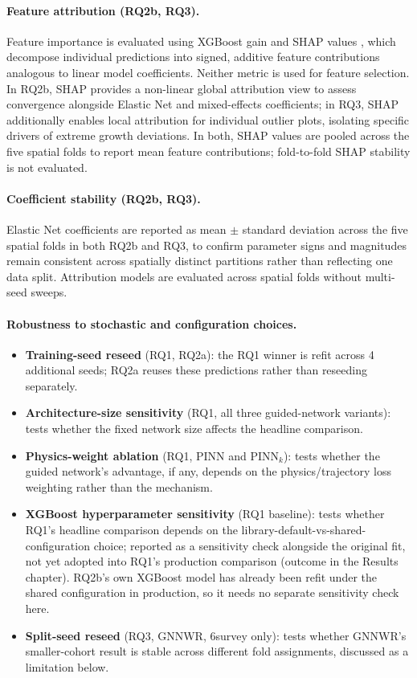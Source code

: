 \documentclass[11pt,a4paper]{report}
\begin{document}
\paragraph*{Feature attribution (RQ2b, RQ3).}
Feature importance is evaluated using XGBoost gain and SHAP values \citep{lundberg2017unified}, which decompose individual predictions into signed, additive feature contributions analogous to linear model coefficients. Neither metric is used for feature selection. In RQ2b, SHAP provides a non-linear global attribution view to assess convergence alongside Elastic Net and mixed-effects coefficients; in RQ3, SHAP additionally enables local attribution for individual outlier plots, isolating specific drivers of extreme growth deviations. In both, SHAP values are pooled across the five spatial folds to report mean feature contributions; fold-to-fold SHAP stability is not evaluated.

\paragraph*{Coefficient stability (RQ2b, RQ3).}
Elastic Net coefficients are reported as mean $\pm$ standard deviation across the five spatial folds in both RQ2b and RQ3, to confirm parameter signs and magnitudes remain consistent across spatially distinct partitions rather than reflecting one data split. Attribution models are evaluated across spatial folds without multi-seed sweeps.

\paragraph*{Robustness to stochastic and configuration choices.}
\begin{itemize}
\setlength\itemsep{0pt}
\item \textbf{Training-seed reseed} (RQ1, RQ2a): the RQ1 winner is refit across 4 additional seeds; RQ2a reuses these predictions rather than reseeding separately.
\item \textbf{Architecture-size sensitivity} (RQ1, all three guided-network variants): tests whether the fixed network size affects the headline comparison.
\item \textbf{Physics-weight ablation} (RQ1, PINN and PINN$_k$): tests whether the guided network's advantage, if any, depends on the physics/trajectory loss weighting rather than the mechanism.
\item \textbf{XGBoost hyperparameter sensitivity} (RQ1 baseline): tests whether RQ1's headline comparison depends on the library-default-vs-shared-configuration choice; reported as a sensitivity check alongside the original fit, not yet adopted into RQ1's production comparison (outcome in the Results chapter). RQ2b's own XGBoost model has already been refit under the shared configuration in production, so it needs no separate sensitivity check here.
\item \textbf{Split-seed reseed} (RQ3, GNNWR, 6survey only): tests whether GNNWR's smaller-cohort result is stable across different fold assignments, discussed as a limitation below.
\end{itemize}
\end{document}
